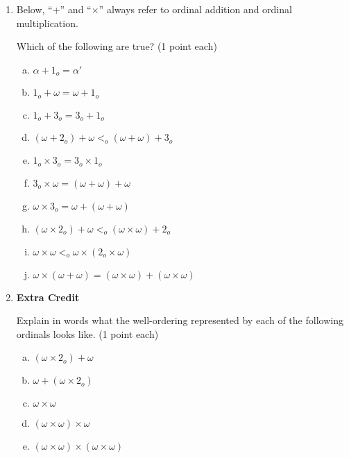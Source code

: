 \documentclass[12pt,a4paper]{article}
\begin{document}
\begin{enumerate}
\item Below, ``+'' and ``$\times$'' always refer to ordinal addition and ordinal multiplication.

Which of the following are true? (1 point each)
\begin{enumerate}[(a)]
\item $\alpha + 1_o =  \alpha'$
\item $1_o + \omega = \omega + 1_o$
\item $1_o + 3_o = 3_o + 1_o$
\item $(\omega + 2_o) + \omega <_o (\omega + \omega) + 3_o$
\item $1_o \times 3_o = 3_o\times 1_o$ 
\item $3_o\times\omega = (\omega + \omega) + \omega$
\item $\omega\times 3_o = \omega + (\omega + \omega)$
\item $(\omega\times 2_o) + \omega <_o (\omega\times\omega) + 2_o$
\item $\omega\times\omega <_o  \omega\times (2_o\times\omega)$
\item $\omega\times (\omega + \omega) = (\omega\times \omega) + (\omega\times \omega)$
\end{enumerate}

\item \textbf{Extra Credit}

Explain in words what the well-ordering represented by each of the following ordinals looks like. (1 point each)
\begin{enumerate}[(a)]
\item $(\omega\times 2_o) + \omega$
\item $\omega + (\omega\times 2_o)$
\item $\omega\times\omega$ 
\item $(\omega\times\omega)\times\omega$
\item $(\omega\times\omega)\times(\omega\times\omega)$
\end{enumerate}

\end{enumerate}
\end{document}
